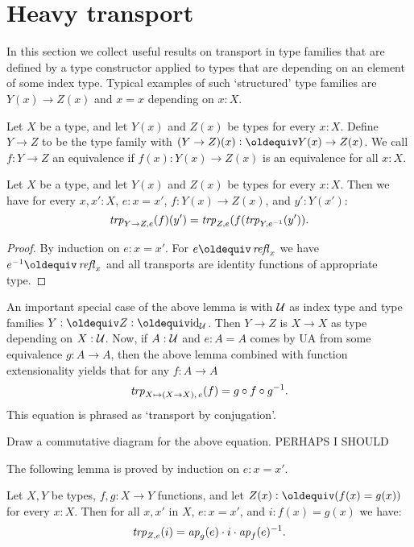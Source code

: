 \section{Heavy transport}
\label{sec:heavy-transport}

In this section we collect useful results on transport in
type families that are defined by a type constructor applied
to types that are depending on an element of some index type.
Typical examples of such `structured' type families are 
$Y(x)\to Z(x)$ and $x=x$ depending on $x:X$.

\begin{definition}\label{def:function-type-families}
Let $X$ be a type, and let $Y(x)$ and $Z(x)$ be types for every $x:X$.
Define $Y\to Z$ to be the type family with $(Y\to Z)(x) \defeq Y(x)\to Z(x)$.
We call $f:Y\to Z$ an equivalence if $f(x): Y(x)\to Z(x)$ is an
equivalence for all $x:X$.
\end{definition}

\begin{lemma}\label{lem:trp-in-function-type}
Let $X$ be a type, and let $Y(x)$ and $Z(x)$ be types for every $x:X$.
Then we have for every $x,x':X$, $e: x=x'$, $f: Y(x)\to Z(x)$, and $y':Y(x')$:
\[
\mathop{\mathit{trp}_{Y\to Z, e}} (f)(y') = \mathop{\mathit{trp}_{Z,e}} (f(\mathop{\mathit{trp}_{Y, e^{-1}}}(y')).
\]
\end{lemma}
\begin{proof}
By induction on $e: x=x'$. For $e \jdeq \refl{x}$ we have $e^{-1}\jdeq \refl{x}$
and all transports are identity functions of appropriate type. 
\end{proof}

An important special case of the above lemma is with $\mathcal{U}$
as index type and type families $Y\defeq Z\defeq \id_\UU$.
Then $Y\to Z$ is $X\to X$ as type depending on $X:\mathcal{U}$. Now, 
if $A:\mathcal{U}$ and $e: A=A$ comes by UA from some equivalence 
$g:A\to A$, then the above lemma combined with function extensionality 
yields that for any $f: A\to A$
\[
\mathop{\mathit{trp}_{X\mapsto(X\to X),\,e}} (f) = g\circ f \circ g^{-1}.
\]
This equation is phrased as `transport by conjugation'.

\begin{xca}\label{xca:conjugation}
Draw a commutative diagram for the above equation. PERHAPS I SHOULD
\end{xca}

The following lemma is proved by induction on $e: x=x'$.

\begin{lemma}\label{lem:trp-in-fx=Ygx}
Let $X,Y$ be types, $f,g: X\to Y$ functions, and let
$Z(x)\defeq (f(x)=g(x))$ for every $x:X$. 
Then for all $x,x'$ in $X$, $e: x=x'$, and $i: f(x)=g(x)$ we have:
\[
\mathop{\mathit{trp}_{Z, e}} (i) = \mathop{{\it ap}_{g}}(e) \cdot i \cdot \mathop{{\it ap}_{f}}(e)^{-1}.
\]
\end{lemma}

